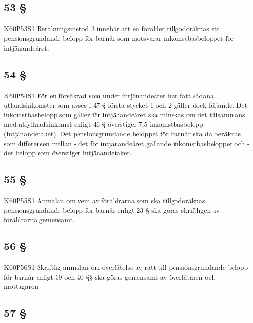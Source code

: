 \documentclass[a4paper,notitlepage,openany,10pt]{book}
\begin{document}
\subsection*{53 §}
\paragraph*{}
{\tiny K60P53S1}
Beräkningsmetod 3 innebär att en förälder tillgodoräknas ett pensionsgrundande belopp för barnår som motsvarar inkomstbasbeloppet för intjänandeåret.
\subsection*{54 §}
\paragraph*{}
{\tiny K60P54S1}
För en försäkrad som under intjänandeåret har fått sådana utlandsinkomster som avses i 47 § första stycket 1 och 2 gäller dock följande. Det inkomstbasbelopp som gäller för intjänandeåret ska minskas om det tillsammans med utfyllnadsinkomst enligt 46 § överstiger 7,5 inkomstbasbelopp (intjänandetaket). Det pensionsgrundande beloppet för barnår ska då beräknas som differensen mellan
\newline - det för intjänandeåret gällande inkomstbasbeloppet och
\newline - det belopp som överstiger intjänandetaket.
\subsection*{55 §}
\paragraph*{}
{\tiny K60P55S1}
Anmälan om vem av föräldrarna som ska tillgodoräknas pensionsgrundande belopp för barnår enligt 23 § ska göras skriftligen av föräldrarna gemensamt.
\subsection*{56 §}
\paragraph*{}
{\tiny K60P56S1}
Skriftlig anmälan om överlåtelse av rätt till pensionsgrundande belopp för barnår enligt 39 och 40 §§ ska göras gemensamt av överlåtaren och mottagaren.
\subsection*{57 §}
\end{document}
